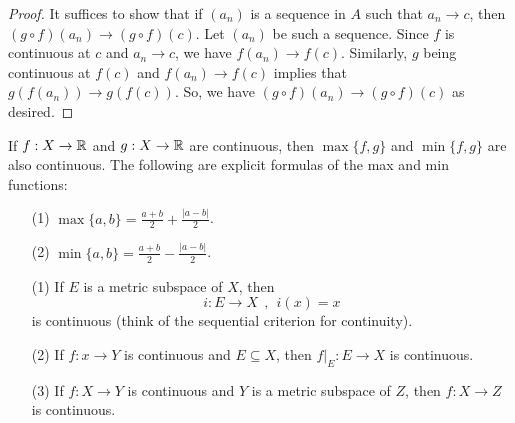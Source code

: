 \documentclass[a4paper]{article}
\begin{document}
\begin{proof}
It suffices to show that if \( ({a}_{n}) \) is a sequence in \( A  \) such that \( {a}_{n} \to c  \), then \( (g \circ f)({a}_{n}) \to (g \circ f)(c) \). Let \( ({a}_{n}) \) be such a sequence. Since \( f \) is continuous at \( c  \) and \( {a}_{n} \to c  \), we have \( f({a}_{n}) \to f(c) \). Similarly, \( g  \) being continuous at \( f(c)  \) and \( f({a}_{n}) \to f(c) \) implies that \( g(f({a}_{n})) \to g(f(c)) \). So, we have \( (g \circ f)({a}_{n}) \to (g \circ f)(c) \) as desired.
\end{proof}

\begin{eg}
    If \( f: X \to \mathbb{R}  \) and \( g: X \to \mathbb{R} \) are continuous, then \( \max \{ f,g \}  \) and \( \min \{ f,g \}  \) are also continuous. The following are explicit formulas of the max and min functions: 
    \begin{enumerate}
        \item[(1)] \( \max \{ a,b \}  = \frac{ a+ b }{ 2  }  + \frac{ | a - b |  }{ 2  }  \).
        \item[(2)] \( \min \{ a,b \}  = \frac{ a + b  }{  2  }  - \frac{ | a- b |  }{ 2 }  \).
    \end{enumerate}
\end{eg}

\begin{eg}
    \begin{enumerate}
        \item[(1)] If \( E  \) is a metric subspace of \( X  \), then
            \[  i : E \to X   \ \ , \ \ i(x) = x \]
            is continuous (think of the sequential criterion for continuity).
        \item[(2)] If \( f: x \to Y \) is continuous and \( E \subseteq  X  \), then \( f |_{E} : E \to X  \) is continuous.
        \item[(3)] If \( f: X \to Y \) is continuous and \( Y  \) is a metric subspace of \( Z  \), then \( f: X \to Z \) is continuous.
    \end{enumerate} 
\end{eg}
\end{document}
